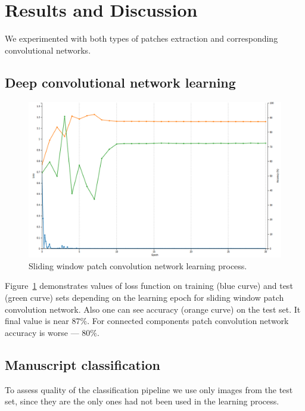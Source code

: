 \documentclass[conference,a4paper,twocolumn]{IEEEtran}
\begin{document}
\section{Results and Discussion}
\label{sec:results_and_description}

We experimented with both types of patches extraction and corresponding convolutional networks. 

\subsection{Deep convolutional network learning}

\begin{figure}[!ht]
\centering
\includegraphics[scale=0.15]{figures/alexnet_loss.png}
\caption{Sliding window patch convolution network learning process.}
\label{img_alexnet}
\end{figure}

Figure~\ref{img_alexnet} demonstrates values of loss function on training (blue curve) and test (green curve) sets depending on the learning epoch for sliding window patch convolution network. Also one can see accuracy (orange curve) on the test set. It final value is near $87 \%$. For connected components patch convolution network accuracy is worse --- $80 \%$.    

\subsection{Manuscript classification}

To assess quality of the classification pipeline we use only images from the test set, since they are the only ones had not been used in the learning process. 
\end{document}
